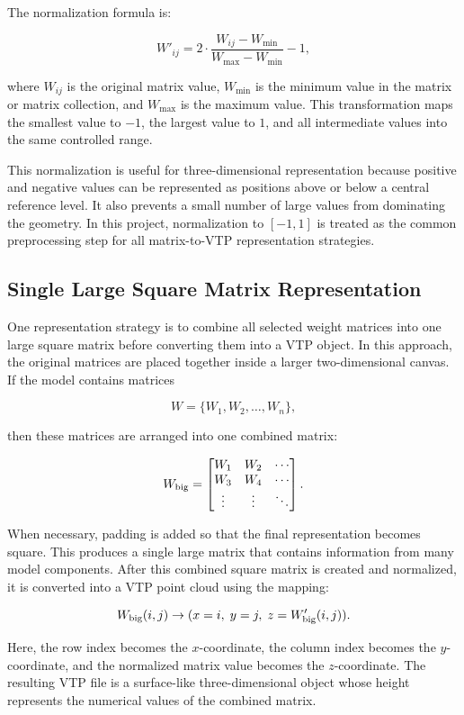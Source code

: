 \documentclass{article}
\begin{document}
\begin{normalsize}
The normalization formula is:

\[
W'_{ij} = 2 \cdot \frac{W_{ij} - W_{\min}}{W_{\max} - W_{\min}} - 1,
\]

where \(W_{ij}\) is the original matrix value, \(W_{\min}\) is the minimum value in the matrix or matrix collection, and \(W_{\max}\) is the maximum value. This transformation maps the smallest value to \(-1\), the largest value to \(1\), and all intermediate values into the same controlled range.

This normalization is useful for three-dimensional representation because positive and negative values can be represented as positions above or below a central reference level. It also prevents a small number of large values from dominating the geometry. In this project, normalization to \([-1,1]\) is treated as the common preprocessing step for all matrix-to-VTP representation strategies.

\subsection{Single Large Square Matrix Representation}

One representation strategy is to combine all selected weight matrices into one large square matrix before converting them into a VTP object. In this approach, the original matrices are placed together inside a larger two-dimensional canvas. If the model contains matrices

\[
W = \{W_1, W_2, \ldots, W_n\},
\]

then these matrices are arranged into one combined matrix:

\[
W_{\textnormal{big}} =
\begin{bmatrix}
W_1 & W_2 & \cdots \\
W_3 & W_4 & \cdots \\
\vdots & \vdots & \ddots
\end{bmatrix}.
\]

When necessary, padding is added so that the final representation becomes square. This produces a single large matrix that contains information from many model components. After this combined square matrix is created and normalized, it is converted into a VTP point cloud using the mapping:

\[
W_{\textnormal{big}}(i,j) \rightarrow (x=i,\; y=j,\; z=W'_{\textnormal{big}}(i,j)).
\]

Here, the row index becomes the \(x\)-coordinate, the column index becomes the \(y\)-coordinate, and the normalized matrix value becomes the \(z\)-coordinate. The resulting VTP file is a surface-like three-dimensional object whose height represents the numerical values of the combined matrix.


\end{normalsize}
\end{document}
